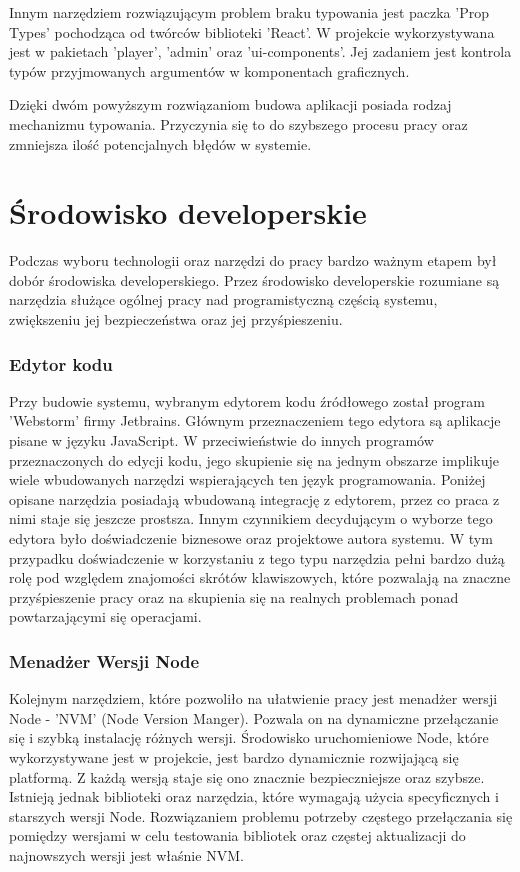 Innym narzędziem rozwiązującym problem braku typowania jest paczka 'Prop Types' pochodząca od twórców biblioteki 'React'. W projekcie wykorzystywana jest w pakietach 'player', 'admin' oraz 'ui-components'. Jej zadaniem jest kontrola typów przyjmowanych argumentów w komponentach graficznych.

Dzięki dwóm powyższym rozwiązaniom budowa aplikacji posiada rodzaj mechanizmu typowania. Przyczynia się to do szybszego procesu pracy oraz zmniejsza ilość potencjalnych błędów w systemie.

\section{Środowisko developerskie}
Podczas wyboru technologii oraz narzędzi do pracy bardzo ważnym etapem był dobór środowiska developerskiego. Przez środowisko developerskie rozumiane są narzędzia służące ogólnej pracy nad programistyczną częścią systemu, zwiększeniu jej bezpieczeństwa oraz jej przyśpieszeniu.

\subsubsection{Edytor kodu}
Przy budowie systemu, wybranym edytorem kodu źródłowego został program 'Webstorm' firmy Jetbrains. Głównym przeznaczeniem tego edytora są aplikacje pisane w języku JavaScript. W przeciwieństwie do innych programów przeznaczonych do edycji kodu, jego skupienie się na jednym obszarze implikuje wiele wbudowanych narzędzi wspierających ten język programowania. Poniżej opisane narzędzia posiadają wbudowaną integrację z edytorem, przez co praca z nimi staje się jeszcze prostsza. Innym czynnikiem decydującym o wyborze tego edytora było doświadczenie biznesowe oraz projektowe autora systemu. W tym przypadku doświadczenie w korzystaniu z tego typu narzędzia pełni bardzo dużą rolę pod względem znajomości skrótów klawiszowych, które pozwalają na znaczne przyśpieszenie pracy oraz na skupienia się na realnych problemach ponad powtarzającymi się operacjami.


\subsubsection{Menadżer Wersji Node}
Kolejnym narzędziem, które pozwoliło na ułatwienie pracy jest menadżer wersji Node - 'NVM' (Node Version Manger).
Pozwala on na dynamiczne przełączanie się i szybką instalację różnych wersji. Środowisko uruchomieniowe Node, które wykorzystywane jest w projekcie, jest bardzo dynamicznie rozwijającą się platformą. Z każdą wersją staje się ono znacznie bezpieczniejsze oraz szybsze. Istnieją jednak biblioteki oraz narzędzia, które wymagają użycia specyficznych \newline i starszych wersji Node. Rozwiązaniem problemu potrzeby częstego przełączania się pomiędzy wersjami w celu testowania bibliotek oraz częstej aktualizacji do najnowszych wersji jest właśnie NVM.\cite{NVMDocs}

